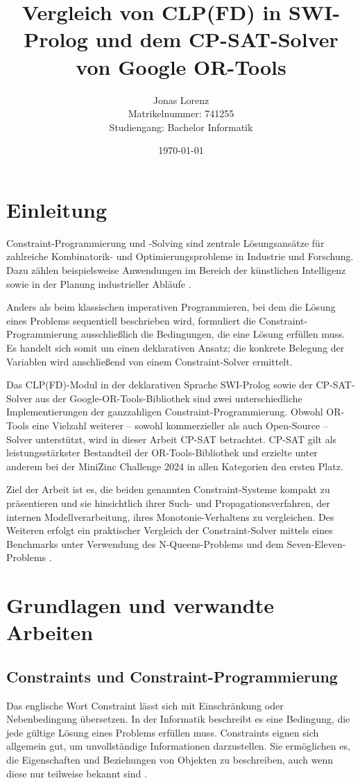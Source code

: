 \documentclass[12pt,a4paper]{article}
\title{Vergleich von CLP(FD) in SWI-Prolog und dem CP-SAT-Solver von Google OR-Tools}
\author{Jonas Lorenz\\Matrikelnummer: 741255\\Studiengang: Bachelor Informatik}
\date{\today}
\begin{document}
\maketitle
\thispagestyle{empty}

\newpage

\tableofcontents
\thispagestyle{empty}
\newpage


\section{Einleitung}
\label{sec:einleitung}
Constraint-Programmierung und -Solving sind zentrale Lösungsansätze für zahlreiche Kombinatorik- und Optimierungsprobleme in Industrie und Forschung.
Dazu zählen beispielsweise Anwendungen im Bereich der künstlichen Intelligenz \cite{popescu2022} sowie in der Planung industrieller Abläufe \cite{clp_book}.

Anders als beim klassischen imperativen Programmieren, bei dem die Lösung eines Problems sequentiell beschrieben wird, formuliert die Constraint-Programmierung ausschließlich die Bedingungen, die eine Lösung erfüllen muss.
Es handelt sich somit um einen deklarativen Ansatz; die konkrete Belegung der Variablen wird anschließend von einem Constraint-Solver ermittelt.

Das CLP(FD)-Modul in der deklarativen Sprache SWI-Prolog sowie der CP-SAT-Solver aus der Google-OR-Tools-Bibliothek sind zwei unterschiedliche Implementierungen der ganzzahligen Constraint-Programmierung.
Obwohl OR-Tools eine Vielzahl weiterer -- sowohl kommerzieller als auch Open-Source -- Solver unterstützt, wird in dieser Arbeit CP-SAT betrachtet.
CP-SAT gilt als leistungsstärkster Bestandteil der OR-Tools-Bibliothek und erzielte unter anderem bei der MiniZinc Challenge 2024 \cite{minizinc2024,perron} in allen Kategorien den ersten Platz.

Ziel der Arbeit ist es, die beiden genannten Constraint-Systeme kompakt zu präsentieren und sie hinsichtlich ihrer Such- und Propagationsverfahren, der internen Modellverarbeitung, ihres Monotonie-Verhaltens zu vergleichen.
Des Weiteren erfolgt ein praktischer Vergleich der Constraint-Solver mittels eines Benchmarks unter Verwendung des N-Queens-Problems \cite{nqueens} und dem Seven-Eleven-Problems \cite{seven_eleven}. 

\section{Grundlagen und verwandte Arbeiten}
\subsection{Constraints und Constraint-Programmierung}
Das englische Wort \glqq Constraint\grqq{} lässt sich mit Einschränkung oder Nebenbedingung übersetzen.
In der Informatik beschreibt es eine Bedingung, die jede gültige Lösung eines Problems erfüllen muss.
Constraints eignen sich allgemein gut, um unvollständige Informationen darzustellen.
Sie ermöglichen es, die Eigenschaften und Beziehungen von Objekten zu beschreiben, auch wenn diese nur teilweise bekannt sind \cite{clp_book}.
\end{document}
